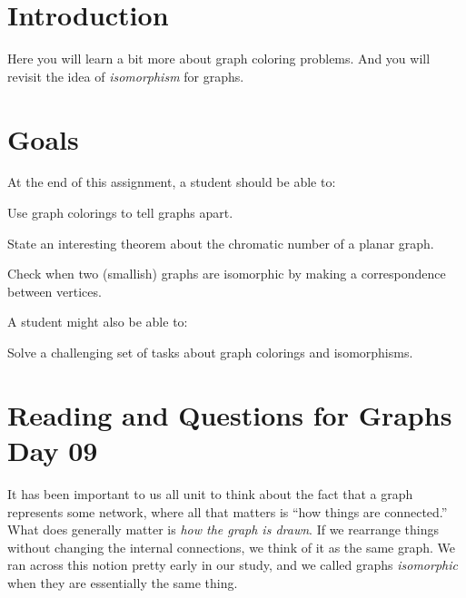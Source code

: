 \documentclass[12pt,letterpaper]{article}
\theoremstyle{definition}
\begin{document}
\setlength{\parskip}{1ex plus 0.5ex minus 0.2ex}
\setlength{\parindent}{0pt}

\pagestyle{fancy}
\cfoot{}

\section*{Introduction}

Here you will learn a bit more about graph coloring problems. And you will revisit the idea of \emph{isomorphism}
for graphs.

\section*{Goals}
At the end of this assignment, a student should be able to:
\begin{compactitem}
\item Use graph colorings to tell graphs apart.
\item State an interesting theorem about the chromatic number of a planar graph.
\item Check when two (smallish) graphs are isomorphic by making a correspondence between vertices.
\end{compactitem}
A student might also be able to:
\begin{compactitem}
\item Solve a challenging set of tasks about graph colorings and isomorphisms.
\end{compactitem}

\section*{Reading and Questions for Graphs Day 09}

It has been important to us all unit to think about the fact that a graph represents some network, where all that matters is ``how things are connected.'' What does generally matter is \textit{how the graph is drawn}. If we rearrange things without changing the internal connections, we think of it as the same graph. We ran across this
notion pretty early in our study, and we called graphs \emph{isomorphic} when they are essentially the same thing.
\end{document}
